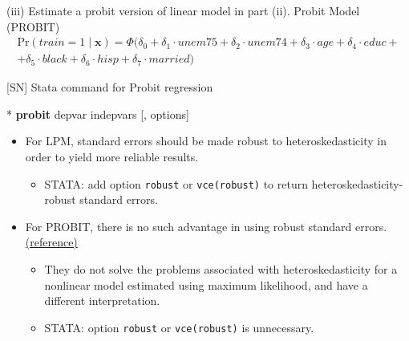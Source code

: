 \documentclass[
  10pt,
  ignorenonframetext,
]{beamer}
\newenvironment{Shaded}{\begin{snugshade}}{\end{snugshade}}
\newcommand{\KeywordTok}[1]{\textcolor[rgb]{0.13,0.29,0.53}{\textbf{#1}}}
\newcommand{\NormalTok}[1]{#1}
\providecommand{\tightlist}{%
  \setlength{\itemsep}{0pt}\setlength{\parskip}{0pt}}
\begin{document}
\begin{frame}{(iii) Estimate a probit version of linear model in part
(ii).}
\protect\hypertarget{iii-estimate-a-probit-version-of-linear-model-in-part-ii.}{}
Probit Model (PROBIT) \small \[
\begin{aligned}
\text{Pr}(train = 1 \mid \mathbf{x}) = \Phi(\delta_0 + \delta_1 \cdot unem75 + \delta_2 \cdot unem74 + \delta_3 \cdot age + \delta_4 \cdot educ +\\
+ \delta_5 \cdot black + \delta_6 \cdot hisp + \delta_7 \cdot married)
\end{aligned}
\]
\end{frame}

\begin{frame}[fragile]{{[}SN{]} Stata command for Probit regression}
\protect\hypertarget{sn-stata-command-for-probit-regression}{}
\small

\begin{Shaded}
\begin{Highlighting}[]
\NormalTok{* }\KeywordTok{probit}\NormalTok{ depvar indepvars [, options]}
\end{Highlighting}
\end{Shaded}

\begin{itemize}
\tightlist
\item
  For LPM, standard errors should be made robust to heteroskedasticity
  in order to yield more reliable results.

  \begin{itemize}
  \tightlist
  \item
    STATA: add option \texttt{robust} or \texttt{vce(robust)} to return
    heteroskedasticity-robust standard errors.
  \end{itemize}
\end{itemize}

\vspace{0.8mm}

\begin{itemize}
\tightlist
\item
  For PROBIT, there is no such advantage in using robust standard
  errors.
  \href{https://blog.stata.com/2016/08/30/two-faces-of-misspecification-in-maximum-likelihood-heteroskedasticity-and-robust-standard-errors/\#disqus_thread}{(reference)}

  \begin{itemize}
  \tightlist
  \item
    They do not solve the problems associated with heteroskedasticity
    for a nonlinear model estimated using maximum likelihood, and have a
    different interpretation.
  \item
    STATA: option \texttt{robust} or \texttt{vce(robust)} is
    unnecessary.
  \end{itemize}
\end{itemize}
\end{frame}
\end{document}
